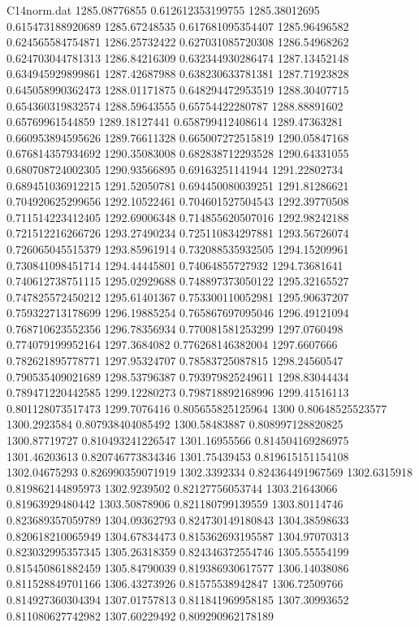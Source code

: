 \begin{filecontents}{C14norm.dat}
1285.08776855			0.612612353199755
1285.38012695			0.615473188920689
1285.67248535			0.617681095354407
1285.96496582			0.624565584754871
1286.25732422			0.627031085720308
1286.54968262			0.624703044781313
1286.84216309			0.632344930286474
1287.13452148			0.634945929899861
1287.42687988			0.638230633781381
1287.71923828			0.645058990362473
1288.01171875			0.648294472953519
1288.30407715			0.654360319832574
1288.59643555			0.65754422280787
1288.88891602			0.65769961544859
1289.18127441			0.658799412408614
1289.47363281			0.660953894595626
1289.76611328			0.665007272515819
1290.05847168			0.676814357934692
1290.35083008			0.682838712293528
1290.64331055			0.680708724002305
1290.93566895			0.69163251141944
1291.22802734			0.689451036912215
1291.52050781			0.694450080039251
1291.81286621			0.704920625299656
1292.10522461			0.704601527504543
1292.39770508			0.711514223412405
1292.69006348			0.714855620507016
1292.98242188			0.721512216266726
1293.27490234			0.725110834297881
1293.56726074			0.726065045515379
1293.85961914			0.732088535932505
1294.15209961			0.730841098451714
1294.44445801			0.74064855727932
1294.73681641			0.740612738751115
1295.02929688			0.748897373050122
1295.32165527			0.747825572450212
1295.61401367			0.753300110052981
1295.90637207			0.759322713178699
1296.19885254			0.765867697095046
1296.49121094			0.768710623552356
1296.78356934			0.770081581253299
1297.0760498			0.774079199952164
1297.3684082			0.776268146382004
1297.6607666			0.782621895778771
1297.95324707			0.78583725087815
1298.24560547			0.790535409021689
1298.53796387			0.793979825249611
1298.83044434			0.789471220442585
1299.12280273			0.798718892168996
1299.41516113			0.801128073517473
1299.7076416			0.805655825125964
1300			0.80648525523577
1300.2923584			0.807938404085492
1300.58483887			0.808997128820825
1300.87719727			0.810493241226547
1301.16955566			0.814504169286975
1301.46203613			0.820746773834346
1301.75439453			0.819615151154108
1302.04675293			0.826990359071919
1302.3392334			0.824364491967569
1302.6315918			0.819862144895973
1302.9239502			0.82127756053744
1303.21643066			0.81963929480442
1303.50878906			0.821180799139559
1303.80114746			0.823689357059789
1304.09362793			0.824730149180843
1304.38598633			0.820618210065949
1304.67834473			0.815362693195587
1304.97070313			0.823032995357345
1305.26318359			0.824346372554746
1305.55554199			0.815450861882459
1305.84790039			0.819386930617577
1306.14038086			0.811528849701166
1306.43273926			0.81575538942847
1306.72509766			0.814927360304394
1307.01757813			0.811841969958185
1307.30993652			0.811080627742982
1307.60229492			0.809290962178189

\end{filecontents}
